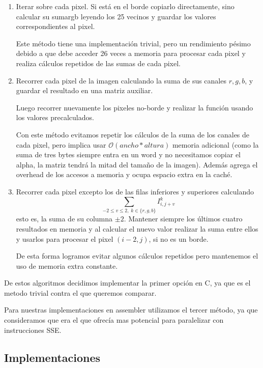 \begin{enumerate}

\item Iterar sobre cada pixel. Si está en el borde copiarlo directamente, sino calcular su sumargb leyendo los 25 vecinos y guardar los valores correspondientes al pixel.

    Este método tiene una implementación trivial, pero un rendimiento pésimo debido a que debe acceder 26 veces a memoria para procesar cada pixel y realiza cálculos repetidos de las sumas de cada pixel.

\item Recorrer cada pixel de la imagen calculando la suma de sus canales $r,g,b$, y guardar el resultado en una matriz auxiliar.

    Luego recorrer nuevamente los pixeles no-borde y realizar la función usando los valores precalculados.

    Con este método evitamos repetir los cálculos de la suma de los canales de cada pixel, pero implica usar $\mathcal{O}(ancho * altura)$ memoria adicional (como la suma de tres bytes siempre entra en un word y no necesitamos copiar el alpha, la matriz tendrá la mitad del tamaño de la imagen). Además agrega el overhead de los accesos a memoria y ocupa espacio extra en la caché.

\item Recorrer cada pixel excepto los de las filas inferiores y superiores calculando $$\sum_{-2 \le v \le 2,\; k \in \{r,g,b\}} I^k_{i, j+v}$$ esto es, la suma de su columna $\pm 2$.
    Mantener siempre los últimos cuatro resultados en memoria y al calcular el nuevo valor realizar la suma entre ellos y usarlos para procesar el pixel $(i-2,j)$, si no es un borde.

    De esta forma logramos evitar algunos cálculos repetidos pero mantenemos el uso de memoria extra constante.

\end{enumerate}

De estos algoritmos decidimos implementar la primer opción en C, ya que es el metodo trivial contra el que queremos comparar.

Para nuestras implementaciones en assembler utilizamos el tercer método, ya que consideramos que era el que ofrecía mas potencial para paralelizar con instrucciones SSE.

\subsection{Implementaciones}

